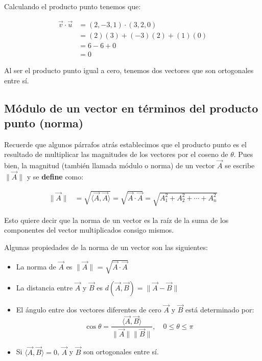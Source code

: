 \documentclass{article}
\begin{document}
            Calculando el producto punto tenemos que:

            \begin{equation*}
                \begin{aligned}
                    \vec{v} \cdot \vec{u} &=(2,-3,1) \cdot(3,2,0) \\
                    &=(2)(3)+(-3)(2)+(1)(0) \\
                    &=6-6+0 \\
                    &=0
                \end{aligned}
            \end{equation*}

            Al ser el producto punto igual a cero, tenemos dos vectores que son ortogonales entre sí.
    
    \subsection{Módulo de un vector en términos del producto punto (norma)}

        Recuerde que algunos párrafos atrás establecimos que el producto punto es el resultado de multiplicar las magnitudes de los vectores por el coseno de $\theta$. Pues bien, la magnitud (también llamada módulo o norma) de un vector $\vec{A}$ se escribe $\parallel\vec{A}\parallel$ y se \textbf{define} como:

        \begin{align}
            \parallel \vec{A}\parallel &= \sqrt{\langle \vec{A}, \vec{A}\rangle} = \sqrt{\vec{A} \cdot \vec{A}} = \sqrt{A_{1}^{2}+A_{2}^{2}+\cdots+A_{n}^{2}}
        \end{align}

        Esto quiere decir que la norma de un vector es la raíz de la suma de los componentes del vector multiplicados consigo mismos.

        Algunas propiedades de la norma de un vector son las siguientes:

        \begin{itemize}

            \item La norma de $\vec{A}$ es $\parallel \vec{A}\parallel$ = $\sqrt{\vec{A} \cdot \vec{A}}$
            \item La distancia entre $\vec{A}$ y $\vec{B}$ es $d(\vec{A}, \vec{B}) = \parallel \vec{A} - \vec{B} \parallel$
            \item El ángulo entre dos vectores diferentes de cero $\vec{A}$ y $\vec{B}$ está determinado por: \\
            \begin{equation}
                \cos \theta=\frac{\langle\vec{A}, \vec{B}\rangle}{\parallel\vec{A}\parallel\parallel\vec{B}\parallel}, \quad 0 \leq \theta \leq \pi
            \end{equation}
            \item Si $\langle \vec{A}, \vec{B}\rangle = 0$, $\vec{A}$ y $\vec{B}$ son ortogonales entre sí.

        \end{itemize}
\end{document}
